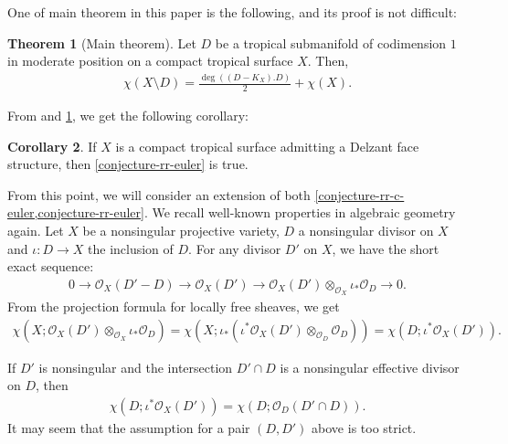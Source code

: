\documentclass[a4paper,dvipdfmx,reqno,12pt]{amsart}
\theoremstyle{definition}
\newtheorem{theorem}{Theorem}[section]
\newtheorem{corollary}[theorem]{Corollary}
\newcommand{\opn}[1]{\operatorname{#1}}
\numberwithin{equation}{section}
\begin{document}
One of main theorem in this paper
is the following, and its proof is not difficult:
\begin{theorem}[{Main theorem}]
\label{theorem-rr-euler-surface}
Let $D$ be a tropical submanifold of codimension $1$
in moderate position on a compact tropical surface
$X$. Then,
\begin{align}
\chi(X\setminus D)=\frac{\opn{deg}((D-K_X).D)}{2}+
\chi(X).
\end{align}
\end{theorem}
From \cite[Theorem 6.3]{demedrano2023chern}
and \cref{theorem-rr-euler-surface}, we get
the following corollary:
\begin{corollary}
\label{corollary-ds-euler-rr}
If $X$ is a compact tropical surface admitting 
a Delzant face structure, then
\cref{conjecture-rr-euler} is true.
\end{corollary}
From this point, 
we will consider an extension of both
\cref{conjecture-rr-c-euler,conjecture-rr-euler}.
We recall well-known properties in algebraic geometry again.
Let $X$ be a nonsingular projective variety,
$D$ a nonsingular divisor on $X$ and
$\iota\colon D\to X$ the inclusion of $D$.
For any divisor $D'$ on $X$, we have
the short exact sequence:
\begin{align}
0 \to \mathcal{O}_X(D'-D)\to \mathcal{O}_X(D')
\to \mathcal{O}_X(D')
\otimes_{\mathcal{O}_X} \iota_*\mathcal{O}_D \to 0. 
\end{align}
From the projection formula for locally free sheaves,
we get 
\begin{align}
\chi(X;\mathcal{O}_X(D')\otimes_{\mathcal{O}_X} \iota_*\mathcal{O}_D)
=\chi(X;\iota_*(\iota^{*}\mathcal{O}_X(D')\otimes_{\mathcal{O}_D} \mathcal{O}_D))
=\chi(D;\iota^{*}\mathcal{O}_X(D')).
\end{align}

If $D'$ is nonsingular and the intersection
$D'\cap D$ is a nonsingular effective divisor
on $D$, then
\begin{align}
\chi(D;\iota^{*}\mathcal{O}_X(D'))=\chi(D;\mathcal{O}_D(D'\cap D)).
\end{align}
It may seem that 
the assumption for a pair $(D,D')$ above is
too strict.
\end{document}
